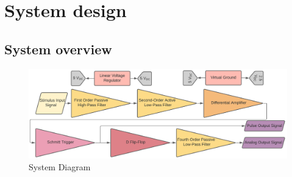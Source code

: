 
\chapter{System design}
\section{System overview} \label{sec:system}

\begin{figure}[h]
    \centering
    \vspace{-0.7cm}
    \includegraphics[width = 1\textwidth]{Figures/overview}
    \caption{System Diagram}
    \label{fig:overview}
\end{figure}

